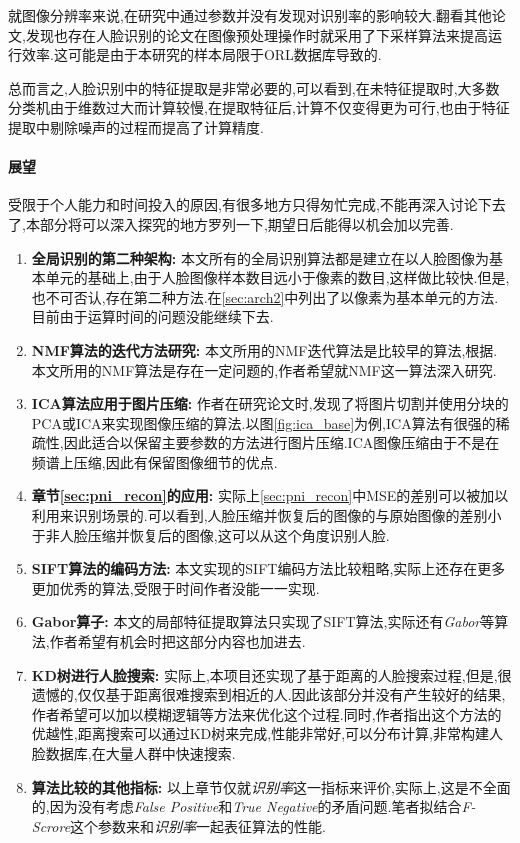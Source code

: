 就图像分辨率来说,在研究中通过参数并没有发现对识别率的影响较大.翻看其他论文,发现也存在人脸识别的论文在图像预处理操作时就采用了下采样算法来提高运行效率.这可能是由于本研究的样本局限于ORL数据库导致的.


总而言之,人脸识别中的特征提取是非常必要的,可以看到,在未特征提取时,大多数分类机由于维数过大而计算较慢,在提取特征后,计算不仅变得更为可行,也由于特征提取中剔除噪声的过程而提高了计算精度.



\paragraph{展望}
受限于个人能力和时间投入的原因,有很多地方只得匆忙完成,不能再深入讨论下去了,本部分将可以深入探究的地方罗列一下,期望日后能得以机会加以完善.

\begin{enumerate}

\item \textbf{全局识别的第二种架构: }
本文所有的全局识别算法都是建立在以人脸图像为基本单元的基础上,由于人脸图像样本数目远小于像素的数目,这样做比较快.但是,也不可否认,存在第二种方法.在\ref{sec:arch2}中列出了以像素为基本单元的方法.目前由于运算时间的问题没能继续下去.

\item \textbf{NMF算法的迭代方法研究: }
本文所用的NMF迭代算法是比较早的算法,根据\cite{lin2007projected}. 本文所用的NMF算法是存在一定问题的,作者希望就NMF这一算法深入研究.

\item \textbf{ICA算法应用于图片压缩: }
作者在研究论文时,发现了将图片切割并使用分块的PCA或ICA来实现图像压缩的算法.以图\ref{fig:ica_base}为例,ICA算法有很强的稀疏性,因此适合以保留主要参数的方法进行图片压缩.ICA图像压缩由于不是在频谱上压缩,因此有保留图像细节的优点.

\item \textbf{章节\ref{sec:pni_recon}的应用: }
实际上\ref{sec:pni_recon}中MSE的差别可以被加以利用来识别场景的.可以看到,人脸压缩并恢复后的图像的与原始图像的差别小于非人脸压缩并恢复后的图像,这可以从这个角度识别人脸.

\item \textbf{SIFT算法的编码方法: }
本文实现的SIFT编码方法比较粗略,实际上还存在更多更加优秀的算法,受限于时间作者没能一一实现.

\item \textbf{Gabor算子: }
本文的局部特征提取算法只实现了SIFT算法,实际还有\textit{Gabor}等算法,作者希望有机会时把这部分内容也加进去.

\item \textbf{KD树进行人脸搜索: }
实际上,本项目还实现了基于距离的人脸搜索过程,但是,很遗憾的,仅仅基于距离很难搜索到相近的人.因此该部分并没有产生较好的结果,作者希望可以加以模糊逻辑等方法来优化这个过程.同时,作者指出这个方法的优越性,距离搜索可以通过KD树来完成,性能非常好,可以分布计算,非常构建人脸数据库,在大量人群中快速搜索.

\item \textbf{算法比较的其他指标: }
以上章节仅就\textit{识别率}这一指标来评价,实际上,这是不全面的,因为没有考虑\textit{False Positive}和\textit{True Negative}的矛盾问题.笔者拟结合\textit{F-Scrore}这个参数来和\textit{识别率}一起表征算法的性能.

\end{enumerate}
